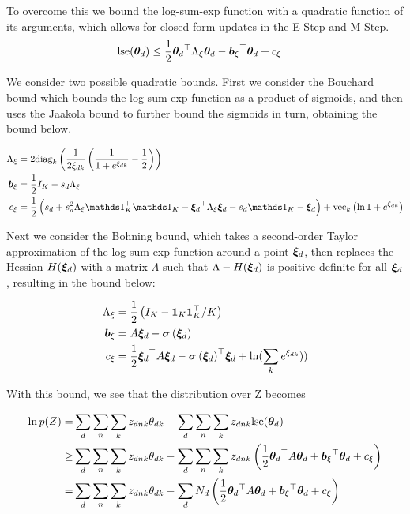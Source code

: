 To overcome this we bound the log-sum-exp function with a quadratic function of its arguments, which allows for closed-form updates in the E-Step and M-Step. 
\begin{align}
\text{lse}({ \bm \theta_d }) & \leq \frac{1}{2} { \bm \theta_d }^\top { \Lambda_{\xi} } {  \bm \theta _d } - { \bm b_{\xi} }^\top{  \bm \theta _d } + { c_{\xi} }
\end{align}

We consider two possible quadratic bounds. First we consider the Bouchard bound\cite{Bouchard2007} which bounds the log-sum-exp function as a product of sigmoids, and then uses the Jaakola bound\cite{Jaakkola1997} to further bound the sigmoids in turn, obtaining the bound below.

\begin{align}
\Axi & = 2 \text{diag}_k
    \left(
        \frac{1}{2\Edk}\left(\frac{1}{1 + e^{\Edk}} - \half\right)
    \right) \\
\bxi & = \half I_K - s_d \Axi \\
\cxi & = \half \left( s_d + s_d^2 \Axi \onek\T\onek - \Ed\T\Axi\Ed -  s_d \onek - \Ed\right) + \text{vec}_k\left({\ln 1+e^{\Edk}}\right)
\end{align} 

Next we consider the Bohning bound\cite{Bohning1988}, which takes a second-order Taylor approximation of the log-sum-exp function around a point ${ \bm \xi_d}$, then replaces the Hessian $H({ \bm \xi_d})$ with a matrix $\Lambda$ such that $\Lambda - H({ \bm \xi_d})$ is positive-definite for all ${ \bm \xi_d}$, resulting in the bound below:

\begin{align}
{ \Lambda_{\xi} } & = \frac{1}{2} \left(I_K - \mathbf{1}_K\mathbf{1}_K^\top / K  \right) \\
{ \bm b_{\xi} } & = A { \bm \xi_d}  - { \bm \sigma\left( { \bm \xi_d} \right) } \\
{ c_{\xi} } & = \frac{1}{2} { \bm \xi_d}^\top A { \bm \xi_d} - { \bm \sigma\left( { \bm \xi_d} \right) }^\top{  \bm \xi _d} + \ln(\sum_k e^{{\xi_{dk}}}))
\end{align} 


With this bound, we see that the distribution over Z becomes

\begin{align}
\ln p(Z) = & \sum_d \sum_n \sum_k { z_{dnk} } { \theta_{dk} } - \sum_d \sum_n \sum_k { z_{dnk} } \text{lse}({ \bm \theta_d }) \\
\geq & \sum_d \sum_n \sum_k { z_{dnk} } { \theta_{dk} } - \sum_d \sum_n \sum_k { z_{dnk} } \left( \frac{1}{2} { \bm \theta_d }^\top A { \bm \theta_d } + { \bm b_{\xi} }^\top{  \bm \theta _d } + { c_{\xi} } \right)\\
= & \sum_d \sum_n \sum_k { z_{dnk} } { \theta_{dk} } - \sum_d N_d \left( \frac{1}{2} { \bm \theta_d }^\top A { \bm \theta_d } + { \bm b_{\xi} }^\top{  \bm \theta _d } + { c_{\xi} } \right)
\end{align}

